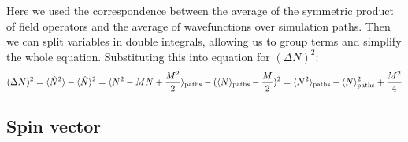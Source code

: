 Here we used the correspondence between the average of the symmetric product of field operators and the average of wavefunctions over simulation paths.
Then we can split variables in double integrals, allowing us to group terms and simplify the whole equation.
Substituting this into equation for $(\Delta N)^2$:
\begin{equation}
\label{eqn:moments-calculation:delta-N}
	(\Delta N)^2
		= \langle \hat{N}^2 \rangle - \langle \hat{N} \rangle^2
		= \langle N^2 - M N + \frac{M^2}{2} \rangle_{\mathrm{paths}} - (\langle N \rangle_{\mathrm{paths}} - \frac{M}{2})^2
		= \langle N^2 \rangle_{\mathrm{paths}} - \langle N \rangle_{\mathrm{paths}}^2 + \frac{M^2}{4}
\end{equation}


\subsection{Spin vector}

